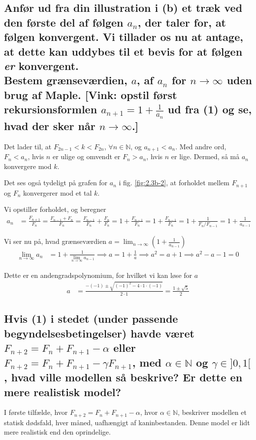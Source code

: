 \documentclass[11pt,a4paper]{article}
\newcommand{\limit}[2]{\lim_{#1 \rightarrow #2}}
\newcommand{\figref}[1]{fig. \ref{fig:#1}}
\begin{document}
\subsection
{
    \mdseries
    Anfør ud fra din illustration i (b) et træk ved den første del af følgen
    ${a_n}$, der taler for, at følgen konvergent. Vi tillader os nu at
    antage, at dette kan uddybes til et bevis for at følgen {\it er}
    konvergent.
    \\\indent
    Bestem grænseværdien, $a$, af $a_n$ for $n \rightarrow \infty$ uden brug
    af Maple. [Vink: opstil først rekursionsformlen $a_{n+1} = 1 +
    \frac{1}{a_n}$ ud fra (1) og se, hvad der sker når $n \rightarrow
    \infty$.]
}
Det lader til, at $F_{2n - 1} < k < F_{2n}$, $\forall n \in \mathbb{N}$, og
$a_{n+1} < a_n$. Med andre ord, $F_n < a_n$, hvis $n$ er ulige og omvendt er
$F_n > a_n$, hvis $n$ er lige. Dermed, så må $a_n$ konvergere mod $k$.

Det ses også tydeligt på grafen for $a_n$ i \figref{2.3b-2}, at forholdet
mellem $F_{n+1}$ og $F_n$ konvergerer mod et tal $k$.

Vi opstiller forholdet, og beregner
\begin{align}
    a_n &= \frac{F_{n+1}}{F_n}
         = \frac{F_{n-1} + F_n}{F_n}
         = \frac{F_{n-1}}{F_n} + \frac{F_n}{F_n}
         = 1 + \frac{F_{n-1}}{F_n}
         = 1 + \frac{F_{n-1}}{F_n}
         = 1 + \frac{1}{F_n / F_{n-1}}
         = 1 + \frac{1}{a_{n-1}}
\end{align}

Vi ser nu på, hvad grænseværdien $a = \limit{n}{\infty} \left( 1 +
\frac{1}{a_{n-1}} \right)$
\begin{align}
    \limit{n}{\infty} a_n &= 1 + \frac{1}{\limit{n}{\infty} a_{n-1}}
    \implies a = 1 + \frac{1}{a}
    \implies a^2 = a + 1
    \implies a^2 - a - 1 = 0
\end{align}

Dette er en andengradspolynomium, for hvilket vi kan løse for $a$
\begin{align}
    a &= \frac{-(-1) \pm \sqrt{(-1)^2 - 4 \cdot 1 \cdot (-1)}}{2 \cdot 1}
       = \frac{1 \pm \sqrt{5}}{2}
\end{align}

\subsection
{
    \mdseries
    Hvis (1) i stedet (under passende begyndelsesbetingelser) havde været
    $F_{n+2} = F_n + F_{n+1} - \alpha$ eller $F_{n+2} = F_n + F_{n+1} -
    \gamma F_{n+1}$, med $\alpha \in \mathbb{N}$ og $\gamma \in ]0,1[$,
    hvad ville modellen så beskrive? Er dette en mere realistisk model?
}
I første tilfælde, hvor $F_{n+2} = F_n + F_{n+1} - \alpha$, hvor $\alpha \in
\mathbb{N}$, beskriver modellen et statisk dødsfald, hver måned, uafhængigt
af kaninbestanden. Denne model er lidt mere realistisk end den oprindelige.
\end{document}
